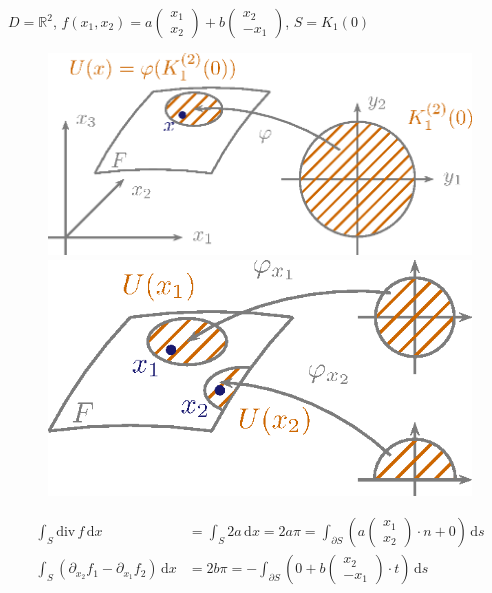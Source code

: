 \documentclass[a4paper,10pt]{scrbook}
\begin{document}
\begin{example}
  $D = \mathbb{R}^2$, $f(x_1,x_2) = a \begin{pmatrix} x_1 \\ x_2 \end{pmatrix} + b \begin{pmatrix} x_2 \\ - x_1 \end{pmatrix}$, $S = K_1(0)$
  \begin{figure}[H]
    \centering
    \includegraphics[scale=0.2]{images/ana3-tmp-66}
    \hspace*{4em}
    \includegraphics[scale=0.2]{images/ana3-tmp-67}
    \vspace*{-3em}
  \end{figure}
  \begin{align*}
    \int_S \mathrm{div}\, f \, \mathrm{d}x &= \int_S 2 a \, \mathrm{d}x = 2 a \pi = \int_{\partial S} \left( a \begin{pmatrix} x_1 \\ x_2 \end{pmatrix} \cdot n + 0 \right) \, \mathrm{d}s \\
    \int_S \left( \partial_{x_2} f_1 - \partial_{x_1} f_2 \right) \, \mathrm{d}x &= 2 b \pi = - \int_{\partial S} \left( 0 + b \begin{pmatrix} x_2 \\ -x_1 \end{pmatrix} \cdot t \right) \, \mathrm{d}s
  \end{align*}
\end{example}
\end{document}
